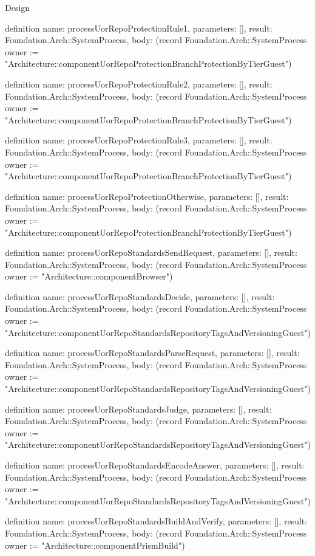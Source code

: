 \begin{lexlean}{Design}
\begin{semanticmodule}
definition{
  name: processUorRepoProtectionRule1,
  parameters: [],
  result: Foundation.Arch::SystemProcess,
  body: (record Foundation.Arch::SystemProcess {owner := "Architecture::componentUorRepoProtectionBranchProtectionByTierGuest"})
}

definition{
  name: processUorRepoProtectionRule2,
  parameters: [],
  result: Foundation.Arch::SystemProcess,
  body: (record Foundation.Arch::SystemProcess {owner := "Architecture::componentUorRepoProtectionBranchProtectionByTierGuest"})
}

definition{
  name: processUorRepoProtectionRule3,
  parameters: [],
  result: Foundation.Arch::SystemProcess,
  body: (record Foundation.Arch::SystemProcess {owner := "Architecture::componentUorRepoProtectionBranchProtectionByTierGuest"})
}

definition{
  name: processUorRepoProtectionOtherwise,
  parameters: [],
  result: Foundation.Arch::SystemProcess,
  body: (record Foundation.Arch::SystemProcess {owner := "Architecture::componentUorRepoProtectionBranchProtectionByTierGuest"})
}

definition{
  name: processUorRepoStandardsSendRequest,
  parameters: [],
  result: Foundation.Arch::SystemProcess,
  body: (record Foundation.Arch::SystemProcess {owner := "Architecture::componentBrowser"})
}

definition{
  name: processUorRepoStandardsDecide,
  parameters: [],
  result: Foundation.Arch::SystemProcess,
  body: (record Foundation.Arch::SystemProcess {owner := "Architecture::componentUorRepoStandardsRepositoryTagsAndVersioningGuest"})
}

definition{
  name: processUorRepoStandardsParseRequest,
  parameters: [],
  result: Foundation.Arch::SystemProcess,
  body: (record Foundation.Arch::SystemProcess {owner := "Architecture::componentUorRepoStandardsRepositoryTagsAndVersioningGuest"})
}

definition{
  name: processUorRepoStandardsJudge,
  parameters: [],
  result: Foundation.Arch::SystemProcess,
  body: (record Foundation.Arch::SystemProcess {owner := "Architecture::componentUorRepoStandardsRepositoryTagsAndVersioningGuest"})
}

definition{
  name: processUorRepoStandardsEncodeAnswer,
  parameters: [],
  result: Foundation.Arch::SystemProcess,
  body: (record Foundation.Arch::SystemProcess {owner := "Architecture::componentUorRepoStandardsRepositoryTagsAndVersioningGuest"})
}

definition{
  name: processUorRepoStandardsBuildAndVerify,
  parameters: [],
  result: Foundation.Arch::SystemProcess,
  body: (record Foundation.Arch::SystemProcess {owner := "Architecture::componentPrismBuild"})
}


\end{semanticmodule}
\end{lexlean}
